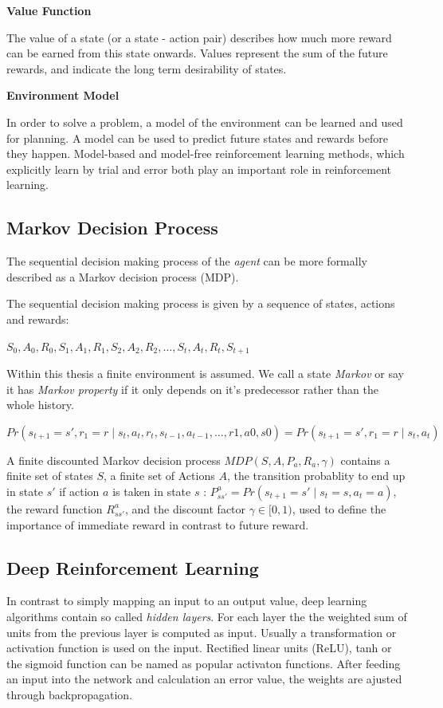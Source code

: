 \textbf{Value Function}

The value of a state (or a state - action pair) describes how much more reward can be earned from this state onwards. Values represent the sum of the future rewards, and indicate the long term desirability of states.

\textbf{Environment Model}

In order to solve a problem, a model of the environment can be learned and used for planning. A model can be used to predict future states and rewards before they happen.
Model-based and model-free reinforcement learning methods, which explicitly learn by trial and error both play an important role in reinforcement learning.

\pagebreak

\subsection{Markov Decision Process} 

The sequential decision making process of the \textit{agent} can be more formally described as a Markov decision process (MDP).

The sequential decision making process is given by a sequence of states, actions and rewards:

$S_0, A_0, R_0, S_1, A_1, R_1, S_2, A_2, R_2, \dots, S_t,A_t,R_t, S_{t+1}$

Within this thesis a finite environment is assumed. We call a state \textit{Markov} or say it has \textit{Markov property} if it only depends on it's predecessor rather than the whole history.

$Pr(s_{t+1} = s', r_1 = r \mid s_t, a_t, r_t, s_{t-1},a_{t-1}, \dots ,r1,a0,s0) = Pr(s_{t+1} = s', r_1 = r \mid s_t,a_t)$

A finite discounted Markov decision process $MDP(S,A,P_a,R_a,\gamma)$ contains a finite set of states $S$, 
a finite set of Actions $A$,
the transition probablity to end up in state $s'$ if action $a$ is taken in state $s$ : 
$P^a_{s s'} = Pr(s_{t+1} = s' \mid s_t = s, a_t = a)$,
the reward function $R^a_{s s'}$,
and the discount factor $\gamma  \in [0,1)$, used to define the importance of immediate reward in contrast to future reward. 

\subsection{Deep Reinforcement Learning}
In contrast to simply mapping an input to an output value, deep learning algorithms contain so called \textit{hidden layers}.
For each layer the the weighted sum of units from the previous layer is computed as input. Usually a transformation or activation function is used on the input. Rectified linear units (ReLU), tanh or the sigmoid function can be named as popular activaton functions.
After feeding an input into the network and calculation an error value, the weights are ajusted through backpropagation.

